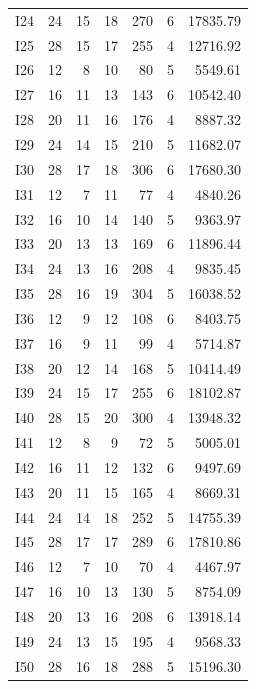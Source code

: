 \begin{longtable}{lrrrrrr}
I24 & 24 & 15 & 18 & 270 & 6 & 17835.79 \\
I25 & 28 & 15 & 17 & 255 & 4 & 12716.92 \\
I26 & 12 & 8 & 10 & 80 & 5 & 5549.61 \\
I27 & 16 & 11 & 13 & 143 & 6 & 10542.40 \\
I28 & 20 & 11 & 16 & 176 & 4 & 8887.32 \\
I29 & 24 & 14 & 15 & 210 & 5 & 11682.07 \\
I30 & 28 & 17 & 18 & 306 & 6 & 17680.30 \\
I31 & 12 & 7 & 11 & 77 & 4 & 4840.26 \\
I32 & 16 & 10 & 14 & 140 & 5 & 9363.97 \\
I33 & 20 & 13 & 13 & 169 & 6 & 11896.44 \\
I34 & 24 & 13 & 16 & 208 & 4 & 9835.45 \\
I35 & 28 & 16 & 19 & 304 & 5 & 16038.52 \\
I36 & 12 & 9 & 12 & 108 & 6 & 8403.75 \\
I37 & 16 & 9 & 11 & 99 & 4 & 5714.87 \\
I38 & 20 & 12 & 14 & 168 & 5 & 10414.49 \\
I39 & 24 & 15 & 17 & 255 & 6 & 18102.87 \\
I40 & 28 & 15 & 20 & 300 & 4 & 13948.32 \\
I41 & 12 & 8 & 9 & 72 & 5 & 5005.01 \\
I42 & 16 & 11 & 12 & 132 & 6 & 9497.69 \\
I43 & 20 & 11 & 15 & 165 & 4 & 8669.31 \\
I44 & 24 & 14 & 18 & 252 & 5 & 14755.39 \\
I45 & 28 & 17 & 17 & 289 & 6 & 17810.86 \\
I46 & 12 & 7 & 10 & 70 & 4 & 4467.97 \\
I47 & 16 & 10 & 13 & 130 & 5 & 8754.09 \\
I48 & 20 & 13 & 16 & 208 & 6 & 13918.14 \\
I49 & 24 & 13 & 15 & 195 & 4 & 9568.33 \\
I50 & 28 & 16 & 18 & 288 & 5 & 15196.30 \\
\end{longtable}
\normalsize
\endgroup

